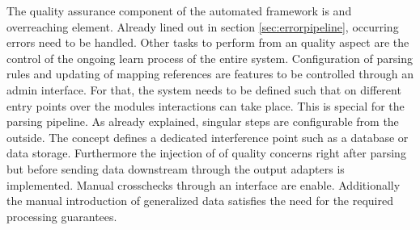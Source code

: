 The quality assurance component of the automated framework is and overreaching element. Already lined out in section \ref{sec:errorpipeline}, occurring errors need to be handled. Other tasks to perform from an quality aspect are the control of the ongoing learn process of the entire system. Configuration of parsing rules and updating of mapping references are features to be controlled through an admin interface. For that, the system needs to be defined such that on different entry points over the modules interactions can take place. This is special for the parsing pipeline. As already explained, singular steps are configurable from the outside. The concept defines a dedicated interference point such as a database or data storage. Furthermore the injection of of quality concerns right after parsing but before sending data downstream through the output adapters is implemented. Manual crosschecks through an interface are enable. Additionally the manual introduction of generalized data satisfies the need for the required processing guarantees. 